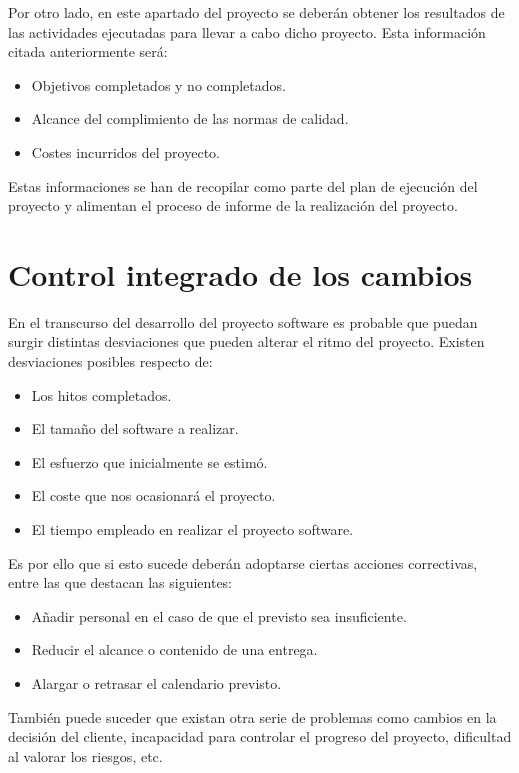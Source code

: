 \documentclass[11pt,a4paper,spanish,twoside]{report}
\begin{document}
Por otro lado, en este apartado del proyecto se deberán obtener los resultados 
de las actividades ejecutadas para llevar a cabo dicho proyecto. Esta 
información citada anteriormente será: 

\begin{itemize}
\item Objetivos completados y no completados.
\item Alcance del complimiento de las normas de calidad.
\item Costes incurridos del proyecto.
\end{itemize}

Estas informaciones se han de recopilar como parte del plan de ejecución del 
proyecto y alimentan el proceso de informe de la realización del proyecto.

\section{Control integrado de los cambios}
En el transcurso del desarrollo del proyecto software es probable que puedan 
surgir distintas desviaciones que pueden alterar el ritmo del proyecto. 
Existen desviaciones posibles respecto de:

\begin{itemize}
\item Los hitos completados.
\item El tamaño del software a realizar.
\item El esfuerzo que inicialmente se estimó.
\item El coste que nos ocasionará el proyecto.
\item El tiempo empleado en realizar el proyecto software.
\end{itemize}

Es por ello que si esto sucede deberán adoptarse ciertas acciones correctivas, 
entre las que destacan las siguientes:

\begin{itemize}
\item Añadir personal en el caso de que el previsto sea insuficiente.
\item Reducir el alcance o contenido de una entrega.
\item Alargar o retrasar el calendario previsto.
\end{itemize}

También puede suceder que existan otra serie de problemas como cambios en la 
decisión del cliente, incapacidad para controlar el progreso del proyecto, 
dificultad al valorar los riesgos, etc.
\end{document}
